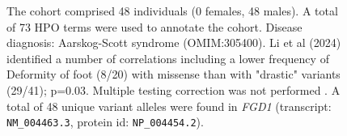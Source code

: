 \begin{figure}[htbp]
    \vspace{2em}
    
    \caption{ The cohort comprised 48 individuals (0 females, 48 males). A total of 73 HPO terms were used to annotate the cohort. Disease diagnosis: Aarskog-Scott syndrome (OMIM:305400). Li et al (2024) identified a number of correlations including a lower frequency of Deformity of foot	
    (8/20) with missense than with "drastic" variants (29/41); p=0.03. Multiple testing correction was not performed \cite{PMID_38411716,PMID_33762894}.  A total of 48 unique variant alleles were found in \textit{FGD1} (transcript: \texttt{NM\_004463.3}, protein id: \texttt{NP\_004454.2}).}
    \end{figure}
    